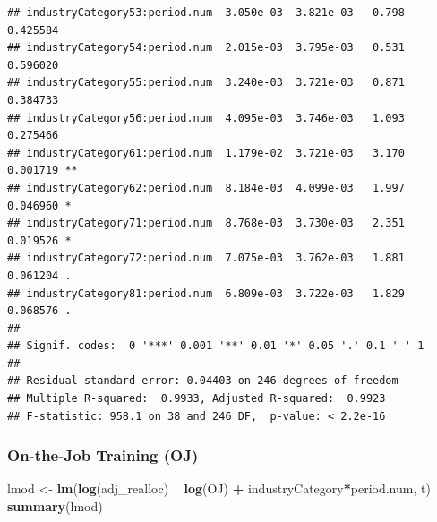 \documentclass[
]{article}
\newenvironment{Shaded}{\begin{snugshade}}{\end{snugshade}}
\newcommand{\KeywordTok}[1]{\textcolor[rgb]{0.13,0.29,0.53}{\textbf{#1}}}
\newcommand{\NormalTok}[1]{#1}
\newcommand{\OperatorTok}[1]{\textcolor[rgb]{0.81,0.36,0.00}{\textbf{#1}}}
\newcommand{\StringTok}[1]{\textcolor[rgb]{0.31,0.60,0.02}{#1}}
\begin{document}
\begin{verbatim}
## industryCategory53:period.num  3.050e-03  3.821e-03   0.798 0.425584    
## industryCategory54:period.num  2.015e-03  3.795e-03   0.531 0.596020    
## industryCategory55:period.num  3.240e-03  3.721e-03   0.871 0.384733    
## industryCategory56:period.num  4.095e-03  3.746e-03   1.093 0.275466    
## industryCategory61:period.num  1.179e-02  3.721e-03   3.170 0.001719 ** 
## industryCategory62:period.num  8.184e-03  4.099e-03   1.997 0.046960 *  
## industryCategory71:period.num  8.768e-03  3.730e-03   2.351 0.019526 *  
## industryCategory72:period.num  7.075e-03  3.762e-03   1.881 0.061204 .  
## industryCategory81:period.num  6.809e-03  3.722e-03   1.829 0.068576 .  
## ---
## Signif. codes:  0 '***' 0.001 '**' 0.01 '*' 0.05 '.' 0.1 ' ' 1
## 
## Residual standard error: 0.04403 on 246 degrees of freedom
## Multiple R-squared:  0.9933, Adjusted R-squared:  0.9923 
## F-statistic: 958.1 on 38 and 246 DF,  p-value: < 2.2e-16
\end{verbatim}

\hypertarget{on-the-job-training-oj}{%
\subsubsection{On-the-Job Training (OJ)}\label{on-the-job-training-oj}}

\begin{Shaded}
\begin{Highlighting}[]
\NormalTok{lmod <-}\StringTok{ }\KeywordTok{lm}\NormalTok{(}\KeywordTok{log}\NormalTok{(adj_realloc) }\OperatorTok{~}\StringTok{  }\KeywordTok{log}\NormalTok{(OJ) }\OperatorTok{+}\StringTok{ }\NormalTok{industryCategory}\OperatorTok{*}\NormalTok{period.num, t)}
\KeywordTok{summary}\NormalTok{(lmod)}
\end{Highlighting}
\end{Shaded}
\end{document}
